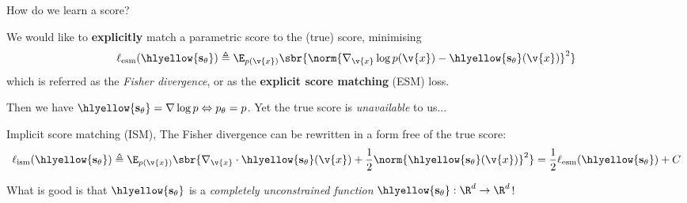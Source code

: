 \begin{frame}{How do we learn a score?}

We would like to \textbf{explicitly} match a parametric score to the (true) score, minimising
\begin{equation}
    \ell_{\mathrm{esm}}(\hlyellow{\mathbf{s}_\theta}) \triangleq \E_{p(\v{x})}\sbr{\norm{\nabla_{\v{x}} \log p(\v{x}) - \hlyellow{\mathbf{s}_\theta}(\v{x})}^2}
    \label{eq:fisher_divergence}
\end{equation}
which is referred as the \textit{Fisher divergence}, or as the \textbf{explicit score matching} (ESM) loss.

Then we have $\hlyellow{\mathbf{s}_\theta} = \nabla \log p \Leftrightarrow p_\theta = p$.
Yet the true score is \textit{unavailable} to us...

\pause
\begin{theorem}{Implicit score matching (ISM), \cite{hyvarinen2005}}{}
The Fisher divergence can be rewritten in a form free of the true score:
\begin{equation}
    \ell_{\mathrm{ism}}(\hlyellow{\mathbf{s}_\theta}) \triangleq \E_{p(\v{x})}\sbr{\nabla_{\v{x}} \cdot \hlyellow{\mathbf{s}_\theta}(\v{x}) + \frac{1}{2}\norm{\hlyellow{\mathbf{s}_\theta}(\v{x})}^2} = \frac{1}{2} \ell_{\mathrm{esm}}(\hlyellow{\mathbf{s}_\theta})  + C
\end{equation}
\end{theorem}

What is good is that $\hlyellow{\mathbf{s}_\theta}$ is a \textit{completely unconstrained function} $\hlyellow{\mathbf{s}_\theta}: \R^d \to \R^d$!
\end{frame}

